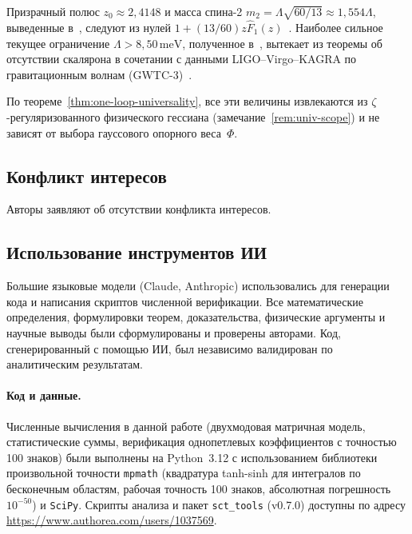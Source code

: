 \documentclass[12pt,a4paper]{article}
\theoremstyle{plain}
\theoremstyle{definition}
\theoremstyle{remark}
\newcommand{\Lam}{\Lambda}
\begin{document}
Призрачный полюс $z_0 \approx 2{,}4148$ и масса спина-2
$m_2 = \Lam\sqrt{60/13} \approx 1{,}554\Lam$, выведенные
в~\cite{Alfyorov:2026ff}, следуют из нулей
$1 + (13/60)z\hat F_1(z)$~\cite{CZ:2013,Alfyorov:2026ff}.
Наиболее сильное текущее ограничение $\Lam > 8{,}50\,\mathrm{meV}$,
полученное в~\cite{Alfyorov:2026ss}, вытекает
из теоремы об отсутствии скалярона в сочетании с данными
LIGO--Virgo--KAGRA по гравитационным волнам
(GWTC-3)~\cite{Alfyorov:2026ss}.

По теореме~\ref{thm:one-loop-universality}, все эти величины
извлекаются из $\zeta$-регуляризованного физического гессиана
(замечание~\ref{rem:univ-scope}) и не зависят от выбора
гауссового опорного веса~$\Phi$.


\subsection*{Конфликт интересов}
Авторы заявляют об отсутствии конфликта интересов.

\subsection*{Использование инструментов ИИ}
Большие языковые модели (Claude, Anthropic) использовались для
генерации кода и написания скриптов численной верификации.
Все математические определения, формулировки теорем, доказательства,
физические аргументы и научные выводы были сформулированы и
проверены авторами.  Код, сгенерированный с помощью ИИ, был
независимо валидирован по аналитическим результатам.

\paragraph{Код и данные.}
Численные вычисления в данной работе (двухмодовая матричная модель,
статистические суммы, верификация однопетлевых коэффициентов с
точностью 100 знаков) были выполнены на Python~3.12 с использованием
библиотеки произвольной точности \texttt{mpmath} (квадратура tanh-sinh
для интегралов по бесконечным областям, рабочая точность 100 знаков,
абсолютная погрешность $10^{-50}$) и \texttt{SciPy}.
Скрипты анализа и пакет \texttt{sct\_tools} (v0.7.0) доступны по
адресу \url{https://www.authorea.com/users/1037569}.



\end{document}
